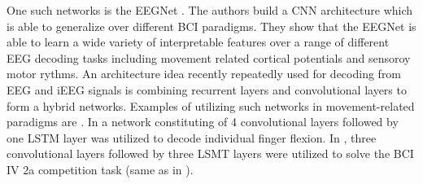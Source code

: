 One such networks is the EEGNet \cite{eeg-net}. The authors build a CNN architecture which is able to generalize over different BCI paradigms.
They show that the EEGNet is able to learn a wide variety of interpretable features over a range of different EEG decoding tasks including movement related cortical potentials and sensoroy motor rythms.
An architecture idea recently repeatedly used for decoding from EEG and iEEG signals is combining recurrent layers and convolutional layers to form a hybrid networks. 
Examples of utilizing such networks in movement-related paradigms are \cite{xie-cnn-lstm-finger-movement, Zhang-2019}.
In \cite{xie-cnn-lstm-finger-movement} a network constituting of 4 convolutional layers followed by one LSTM \cite{lstm-paper} layer was utilized to decode individual finger flexion.
In \cite{Zhang-2019}, three convolutional layers followed by three LSMT layers were utilized to solve the BCI IV 2a competition task (same as in \cite{schirrmeister-deep-2017}). 


